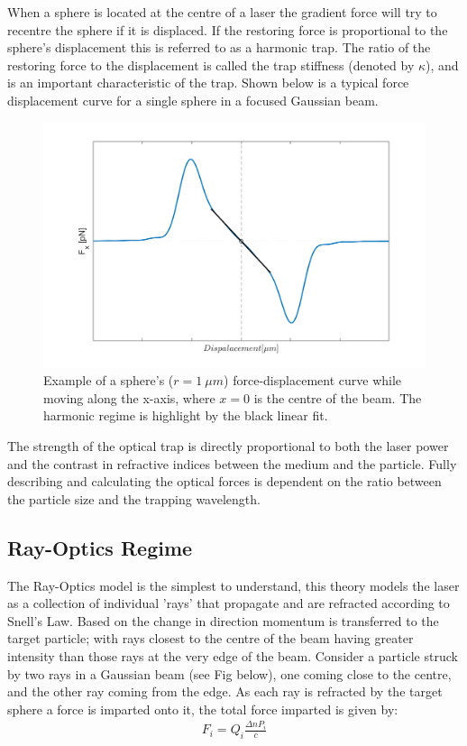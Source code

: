 When a sphere is located at the centre of a laser the gradient force will
try to recentre the sphere if it is displaced. If the restoring force is
proportional to the sphere's displacement this is referred to as a harmonic
trap. The ratio of the restoring force to the displacement is called the 
trap stiffness (denoted by $\kappa$), and is an important characteristic 
of the trap. Shown below is a typical force displacement curve for a single
sphere in a focused Gaussian beam. 

\begin{figure}[h!]
	\centering
	\includegraphics[width=0.78\linewidth]{sphere_force_curve.png}
	\caption{Example of a sphere's ($r=1\ \mu m$) force-displacement curve 
			while moving along the x-axis, where $x=0$ is the centre of the
			beam. The harmonic regime is highlight by the black linear fit.}
	\label{fig:harmonic_trap}
\end{figure}

The strength of the optical trap is directly proportional to both the laser
power and the contrast in refractive indices between the medium and the
particle. Fully describing and calculating the optical forces is dependent on 
the ratio between the particle size and the trapping wavelength. 
\subsection{Ray-Optics Regime}

The Ray-Optics model is the simplest to understand, this theory models 
the laser as a collection of individual 'rays' that propagate and are 
refracted according to Snell's Law. Based on the change in direction 
momentum is transferred to the target particle; with rays closest to 
the centre of the beam having greater intensity than those rays at 
the very edge of the beam. Consider a particle struck by two rays in 
a Gaussian beam (see Fig below), one coming close to the centre, and 
the other ray coming from the edge. As each ray is refracted by the 
target sphere a force is imparted onto it, the total force imparted 
is given by:
\begin{align}
	F_i = Q_i\frac{\Delta n P_i}{c}
\end{align}

